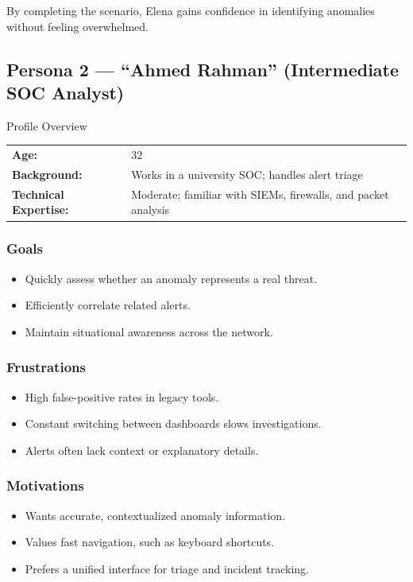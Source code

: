 \documentclass[
    11pt, 
    a4paper, 
    parskip=half, 
    headsepline,       %
    DIV=12             %
]{scrartcl}
\begin{document}
By completing the scenario, Elena gains confidence in identifying anomalies without feeling overwhelmed.

\vspace{1cm} %

\subsection{Persona 2 --- ``Ahmed Rahman'' (Intermediate SOC Analyst)}

\begin{personabox}{Profile Overview}
    \begin{tabularx}{\linewidth}{@{}lX@{}}
        \textbf{Age:} & 32 \\
        \textbf{Background:} & Works in a university SOC; handles alert triage \\
        \textbf{Technical Expertise:} & Moderate; familiar with SIEMs, firewalls, and packet analysis
    \end{tabularx}
\end{personabox}

\subsubsection*{Goals}
\begin{itemize}
    \item Quickly assess whether an anomaly represents a real threat.
    \item Efficiently correlate related alerts.
    \item Maintain situational awareness across the network.
\end{itemize}

\subsubsection*{Frustrations}
\begin{itemize}
    \item High false-positive rates in legacy tools.
    \item Constant switching between dashboards slows investigations.
    \item Alerts often lack context or explanatory details.
\end{itemize}

\subsubsection*{Motivations}
\begin{itemize}
    \item Wants accurate, contextualized anomaly information.
    \item Values fast navigation, such as keyboard shortcuts.
    \item Prefers a unified interface for triage and incident tracking.
\end{itemize}
\end{document}
